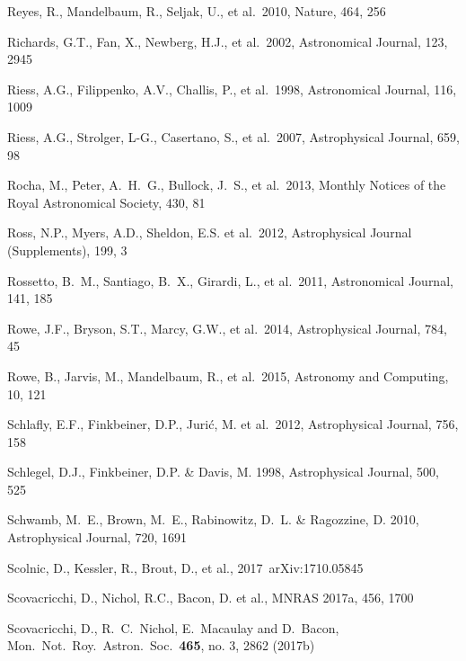 \documentclass[twocolumn]{aastex61}
\begin{document}
\begin{thebibliography}{}
 Reyes, R., Mandelbaum, R., Seljak, U., et al.~2010, Nature, 464, 256

 Richards, G.T., Fan, X., Newberg, H.J., et al.~2002, Astronomical Journal, 123, 2945

 Riess, A.G., Filippenko, A.V., Challis, P., et al.~1998, Astronomical Journal, 116, 1009

 Riess, A.G., Strolger, L-G., Casertano, S., et al.~2007, Astrophysical Journal, 659, 98

 Rocha, M., Peter, A.~H.~G., Bullock, J.~S., et al.\ 2013, Monthly Notices of the Royal Astronomical Society, 430, 81

 Ross, N.P., Myers, A.D., Sheldon, E.S. et al.~2012, Astrophysical Journal (Supplements), 199, 3

 Rossetto, B.~M., Santiago, B.~X., Girardi, L., et al.~2011, Astronomical Journal, 141, 185

 Rowe, J.F., Bryson, S.T., Marcy, G.W., et al.~2014, Astrophysical Journal, 784, 45

 Rowe, B., Jarvis, M., Mandelbaum, R., et al.~2015, Astronomy and Computing,  10, 121

 Schlafly, E.F., Finkbeiner, D.P., Juri\'c, M. et al.~2012, Astrophysical Journal, 756, 158

 Schlegel, D.J., Finkbeiner, D.P. \& Davis, M. 1998, Astrophysical Journal, 500, 525

 Schwamb, M.~E., Brown, M.~E., Rabinowitz, D.~L. \& Ragozzine, D. 2010, Astrophysical Journal, 720, 1691

 Scolnic, D., Kessler, R., Brout, D., et al., 2017~arXiv:1710.05845

 Scovacricchi, D., Nichol, R.C., Bacon, D. et al., MNRAS 2017a, 456, 1700

 Scovacricchi, D., R.~C.~Nichol, E.~Macaulay and D.~Bacon, Mon.\ Not.\ Roy.\ Astron.\ Soc.\  {\bf 465}, no. 3, 2862 (2017b)


\end{thebibliography}
\end{document}
